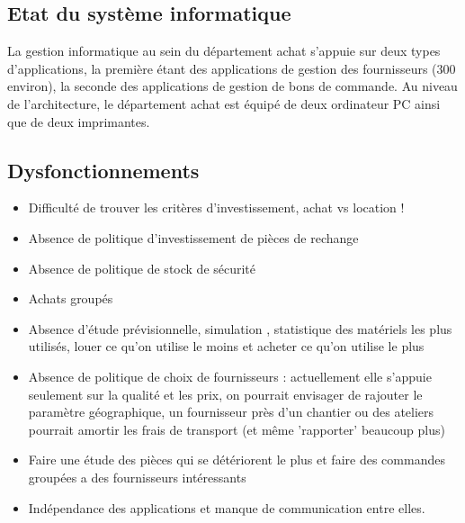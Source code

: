 \subsection{Etat du système informatique}
La gestion informatique au sein du département achat s'appuie sur deux types d'applications, la première étant des applications de gestion des fournisseurs (300 environ), la seconde des applications de gestion de bons de commande.
Au niveau de l'architecture, le département achat est équipé de deux ordinateur PC ainsi que de deux imprimantes.



\subsection{Dysfonctionnements}

\begin{itemize}
    \item Difficulté de trouver les critères d'investissement, achat vs location !
    \item Absence de politique d'investissement de pièces de rechange
    \item Absence de politique de stock de sécurité
    \item Achats groupés
    \item Absence d'étude prévisionnelle, simulation , statistique des matériels les plus utilisés, louer ce qu'on utilise le moins et acheter ce qu'on utilise le plus
    \item Absence de politique de choix de fournisseurs : actuellement elle s'appuie seulement sur la qualité et les prix, on pourrait envisager de rajouter le paramètre géographique, un fournisseur près d'un chantier ou des ateliers pourrait amortir les frais de transport (et même 'rapporter' beaucoup plus)


    \item Faire une étude des pièces qui se détériorent le plus et faire des commandes groupées a des fournisseurs intéressants


    \item Indépendance des applications et manque de communication entre elles.
\end{itemize}
